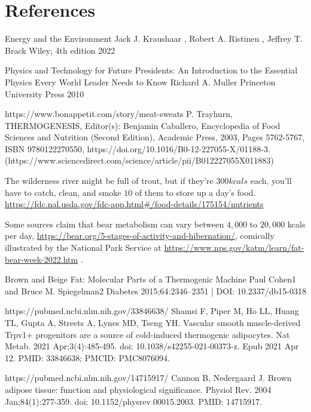 \documentclass[12pt]{iopart}
\begin{document}
\section*{References}
\begin{thebibliography}{99}

Energy and the Environment
Jack J. Kraushaar , Robert A. Ristinen , Jeffrey T. Brack
Wiley; 4th edition 2022

Physics and Technology for Future Presidents: An Introduction to the Essential Physics Every World Leader Needs to Know
Richard A. Muller
Princeton University Press 2010

https://www.bonappetit.com/story/meat-sweats
P. Trayhurn,
THERMOGENESIS,
Editor(s): Benjamin Caballero,
Encyclopedia of Food Sciences and Nutrition (Second Edition),
Academic Press,
2003,
Pages 5762-5767,
ISBN 9780122270550,
https://doi.org/10.1016/B0-12-227055-X/01188-3.
(https://www.sciencedirect.com/science/article/pii/B012227055X011883)

The wilderness river might be full of trout, but if they're $300kcals$ each, you'll have to catch, clean, and smoke $10$ of them to store up a day's food. \url{https://fdc.nal.usda.gov/fdc-app.html#/food-details/175154/nutrients}

Some sources claim that bear metabolism can vary between $4,000$ to $20,000$ kcals per day, \url{https://bear.org/5-stages-of-activity-and-hibernation/}, comically illustrated by the National Park Service at \url{https://www.nps.gov/katm/learn/fat-bear-week-2022.htm} .


Brown and Beige Fat: Molecular Parts of a Thermogenic Machine
Paul Cohen1 and Bruce M. Spiegelman2
Diabetes 2015;64:2346–2351 | DOI: 10.2337/db15-0318

https://pubmed.ncbi.nlm.nih.gov/33846638/
Shamsi F, Piper M, Ho LL, Huang TL, Gupta A, Streets A, Lynes MD, Tseng YH. 
Vascular smooth muscle-derived Trpv1+ progenitors are a source of cold-induced thermogenic adipocytes. Nat Metab. 2021 Apr;3(4):485-495. 
doi: 10.1038/s42255-021-00373-z. Epub 2021 Apr 12. PMID: 33846638; PMCID: PMC8076094.

https://pubmed.ncbi.nlm.nih.gov/14715917/
Cannon B, Nedergaard J. Brown adipose tissue: function and physiological significance. Physiol Rev. 2004 Jan;84(1):277-359. 
doi: 10.1152/physrev.00015.2003. PMID: 14715917.


\end{thebibliography}
\end{document}
